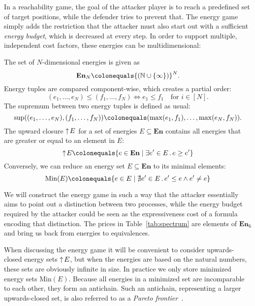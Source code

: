 In a reachability game,
the goal of the attacker player is to reach a predefined set of target positions,
while the defender tries to prevent that.
The energy game simply adds the restriction that the attacker must also start
out with a sufficient \emph{energy budget},
which is decreased at every step.
In order to support multiple, independent cost factors,
these energies can be multidimensional:

\begin{definition}%
    \label{def:energies}
    The set of $N$-dimensional energies is given as
    \[\mathbf{En}_N \colonequals {(\mathbb{N} \cup \{ \infty \})}^N.\]
    Energy tuples are compared component-wise, which creates a partial order:
    \[(e_1, \ldots, e_N) \leq (f_1, \ldots, f_N) \Leftrightarrow e_1 \leq f_1
    \quad \text{for } i \in [N].\]
    The supremum between two energy tuples is defined as usual:
    \[\sup((e_1, \ldots, e_N), (f_1, \ldots, f_N)) \colonequals
        (\max(e_1, f_1), \ldots, \max(e_N, f_N)).\]
    The upward closure $\uparrow\! E$ for a set of energies
    $E \subseteq \mathbf{En}$ contains all energies that are greater or equal
    to an element in $E$:
    \[\upclosed E \colonequals
        \{e \in \mathbf{En} \mid \exists e' \in E\,.\,e \geq e'\}\]
    Conversely, we can reduce an energy set $E \subseteq \mathbf{En}$
    to its minimal elements:
    \[\mathrm{Min} (E) \colonequals
        \{e \in E \mid \nexists e' \in E\,.\,e' \leq e \wedge e' \ne e\}\]
\end{definition}

We will construct the energy game in such a way that the attacker essentially
aims to point out a distinction between two processes,
while the energy budget required by the attacker could be seen as the
expressiveness cost of a formula encoding that distinction.
The prices in Table~\ref{tab:spectrum} are elements of $\mathbf{En}_6$ and
bring us back from energies to equivalences.

When discussing the energy game it will be convenient to consider
upwards-closed energy sets $\uparrow\! E$,
but when the energies are based on the natural numbers,
these sets are obviously infinite in size.
In practice we only store minimized energy sets $\mathrm{Min}(E)$.
Because all energies in a minimized set are incomparable to each other,
they form an antichain.
Such an antichain, representing a larger upwards-closed set,
is also referred to as a \emph{Pareto frontier}~\cite{brihaye2023multi}.

